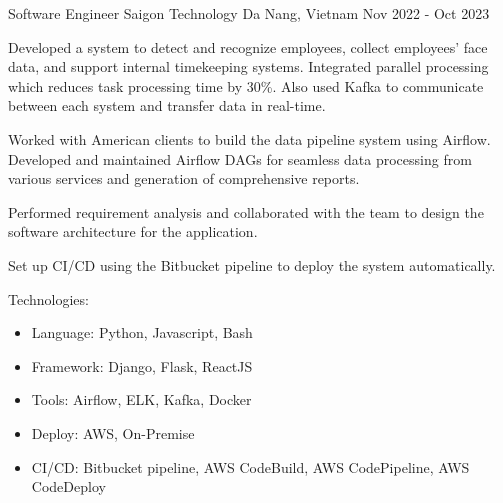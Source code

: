 

\begin{cventries}

    \cventry
    {Software Engineer} %
    {Saigon Technology} %
    {Da Nang, Vietnam} %
    {Nov 2022 - Oct 2023} %
    {
      \begin{cvitems} %
        \item {Developed a system to detect and recognize employees, collect employees' face data, and support internal timekeeping systems. Integrated parallel processing which reduces task processing time by 30\%. Also used Kafka to communicate between each system and transfer data in real-time.}
        \item {Worked with American clients to build the data pipeline system using Airflow. Developed and maintained Airflow DAGs for seamless data processing from various services and generation of comprehensive reports.}
        \item {Performed requirement analysis and collaborated with the team to design the software architecture for the application.}
        \item {Set up CI/CD using the Bitbucket pipeline to deploy the system automatically.}
        \item {Technologies:
          \begin{itemize}
            \item {Language: Python, Javascript, Bash}
            \item {Framework: Django, Flask, ReactJS}
            \item {Tools: Airflow, ELK, Kafka, Docker}
            \item {Deploy: AWS, On-Premise}
            \item {CI/CD: Bitbucket pipeline, AWS CodeBuild, AWS CodePipeline, AWS CodeDeploy}
          \end{itemize}
        }
      \end{cvitems}
    }
    

\end{cventries}
